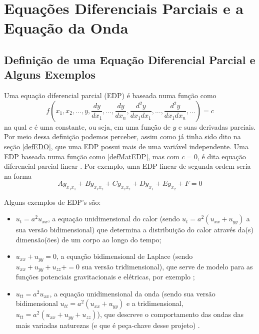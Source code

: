 \chapter{Equações Diferenciais Parciais e a Equação da Onda}

    \label{cap:EDPs}

    \section{Definição de uma Equação Diferencial Parcial e Alguns Exemplos}
    
        \label{EDPdef}
    
        Uma equação diferencial parcial (EDP) é baseada numa função como
        \begin{equation}
            \label{defMatEDP}
            f(x_1, x_2, ..., y, \dfrac{dy}{dx_1}, ..., \dfrac{dy}{dx_n}, 
            \dfrac{d^2y}{dx_1dx_1}, ...,\dfrac{d^2y}{dx_1dx_n}, ...) = c
        \end{equation}
        na qual $c$ é uma constante, ou seja, em uma função de $y$ e suas derivadas parciais.
        Por meio dessa definição podemos perceber, assim como já tinha sido dito na seção \ref{defEDO}, 
        que uma EDP possui mais de uma variável independente. Uma EDP baseada numa função como \ref{defMatEDP}, mas com $c = 0$, é dita equação diferencial parcial linear \cite{wiki:EDP}. Por exemplo, uma EDP linear de segunda ordem seria na forma \cite{EDPWolfram}
        \begin{equation}
            \label{EDPlin2}
            Ay_{x_1x_1} + By_{x_1x_2} + Cy_{x_2x_2} + Dy_{x_1} + Ey_{x_2} + F = 0
        \end{equation}
        
        Alguns exemplos de EDP's são: 
        \begin{itemize}
            \item $u_t = a^2u_{xx}$, a equação unidimensional do calor (sendo $u_t = a^2(u_{xx}+u_{yy})$ a sua versão bidimensional) que determina a distribuição do calor através da(s) dimensão(ões) de um corpo ao longo do tempo;
            \item $u_{xx} + u_{yy} = 0$, a equação bidimensional de Laplace (sendo $u_{xx} + u_{yy} + u_{zz}+ = 0$ sua versão tridimensional), que serve de modelo para as funções potenciais gravitacionais e elétricas, por exemplo \cite{wiki:LaplaceEq};
            \item $u_{tt} = a^2u_{xx}$, a equação unidimensional da onda (sendo sua versão bidimensional $u_{tt} = a^2(u_{xx} + u_{yy})$ e a tridimensional, $u_{tt} = a^2(u_{xx} + u_{yy} + u_{zz})$), que descreve o comportamento das ondas das mais variadas naturezas (e que é peça-chave desse projeto) \cite{EDPSodrenotas}.
        \end{itemize}
        
